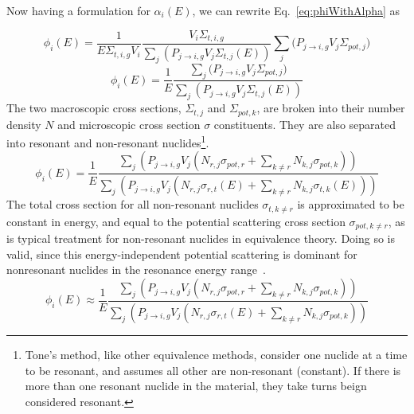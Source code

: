 \documentclass[10pt]{article}
\begin{document}
Now having a formulation for $\alpha_i(E)$, we can rewrite Eq.~\ref{eq:phiWithAlpha} as


\begin{equation}\phi_{i}(E)=\frac{1}{E\Sigma_{t,i,g}V_i}\frac{V_i\Sigma_{t,i,g}}{\sum\limits_{j}\left(P_{j\rightarrow i,g}V_{j}\Sigma_{t,j}(E)\right)}\sum\limits_j\Big(P_{j\rightarrow i,g}V_{j}\Sigma_{pot,j}\Big)\end{equation}
\begin{equation}\phi_{i}(E)=\frac{1}{E}\frac{\sum\limits_j\Big(P_{j\rightarrow i,g}V_{j}\Sigma_{pot,j}\Big)}{\sum\limits_{j}\left(P_{j\rightarrow i,g}V_{j}\Sigma_{t,j}(E)\right)}\end{equation}
  The two macroscopic cross sections, $\Sigma_{t,j}$ and $\Sigma_{pot,k}$, are broken into their number density $N$ and microscopic cross section $\sigma$ constituents. They are also separated into resonant and non-resonant nuclides\footnote{Tone's method, like other equivalence methods, consider one nuclide at a time to be resonant, and assumes all other are non-resonant (constant). If there is more than one resonant nuclide in the material, they take turns beign considered resonant.}. 
\begin{equation}\phi_{i}(E)=\frac{1}{E}\frac{\sum\limits_j\left(P_{j\rightarrow i,g}V_{j}\left(N_{r,j}\sigma_{pot,r}+\sum\limits_{k\neq r}N_{k,j}\sigma_{pot,k}\right)\right)}{\sum\limits_{j}\left(P_{j\rightarrow i,g}V_{j}\left(N_{r,j}\sigma_{r,t}(E)+\sum\limits_{k\neq r}N_{k,j}\sigma_{t,k}(E)\right)\right)}\end{equation}
  The total cross section for all non-resonant nuclides $\sigma_{t,k\neq r}$ is approximated to be constant in energy, and equal to the potential scattering cross section $\sigma_{pot,k\neq r}$, as is typical treatment for non-resonant nuclides in equivalence theory. Doing so is valid, since this energy-independent potential scattering is dominant for nonresonant nuclides in the resonance energy range~\cite{ch9}.
\begin{equation}\phi_{i}(E)\approx\frac{1}{E}\frac{\sum\limits_j\left(P_{j\rightarrow i,g}V_{j}\left(N_{r,j}\sigma_{pot,r}+\sum\limits_{k\neq r}N_{k,j}\sigma_{pot,k}\right)\right)}{\sum\limits_{j}\left(P_{j\rightarrow i,g}V_{j}\left(N_{r,j}\sigma_{r,t}(E)+\sum\limits_{k\neq r}N_{k,j}\sigma_{pot,k}\right)\right)}\label{eq:almost}\end{equation}
\end{document}
